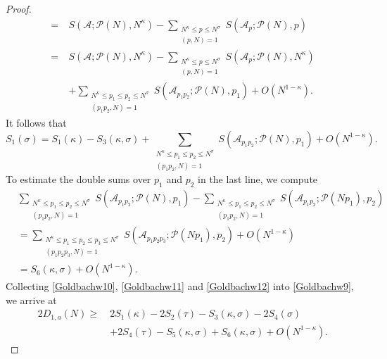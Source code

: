 \documentclass[12pt, a4paper]{amsart}
\def\le{\leqslant}
\def\ge{\geqslant}
\theoremstyle{plain}
\theoremstyle{remark}
\numberwithin{equation}{section}
\begin{document}
\begin{proof}
\begin{equation*}
\begin{split}
= \ & S(\mathscr{A};\mathscr{P}(N),N^\kappa)-\sum\limits_{\substack{N^\kappa\le p\le N^{\sigma} \\(p, N)=1}}S(\mathscr{A}_p ; \mathscr{P}(N), p)\\
= \ & S(\mathscr{A};\mathscr{P}(N),N^\kappa)-\sum\limits_{\substack{N^\kappa\le p\le N^{\sigma} \\(p, N)=1}}S(\mathscr{A}_p ; \mathscr{P}(N), N^\kappa)\\
&+\sum_{\substack{N^\kappa \le p_1 \le p_2 \le N^\sigma \\ (p_1 p_2, N) = 1}}  S(\mathscr{A}_{p_1 p_2}; \mathscr{P}(N), p_1)+O(N^{1-\kappa}). 
\end{split}
\end{equation*}
It follows that 
\begin{equation}\label{Goldbachw11}
S_1(\sigma) =
S_1(\kappa)-S_3(\kappa,\sigma)+\sum_{\substack{N^\kappa \le p_1 \le p_2 \le N^\sigma \\ (p_1 p_2, N) = 1}}  S(\mathscr{A}_{p_1 p_2}; \mathscr{P}(N), p_1)+O(N^{1-\kappa}). 
\end{equation}
To estimate the double sums over $p_1$ and $p_2$ in the last line, we compute 
\begin{equation}\label{Goldbachw12}
\begin{split}
&\sum_{\substack{N^\kappa \le p_1 \le p_2 \le N^\sigma \\ (p_1 p_2, N) = 1}}  S(\mathscr{A}_{p_1 p_2}; \mathscr{P}(N), p_1)-\sum_{\substack{N^\kappa \le p_1 \le p_2 \le N^\sigma \\ (p_1 p_2, N) = 1}}  S(\mathscr{A}_{p_1 p_2}; \mathscr{P}(Np_1), p_2)\\
&= \sum_{\substack{N^\kappa \le p_1 \le p_2 \le p_3 \le N^\sigma \\ (p_1 p_2 p_3, N) = 1}} S(\mathscr{A}_{p_1 p_2 p_3}; \mathscr{P}(N p_1), p_2)+O(N^{1-\kappa})\\
&= S_6(\kappa,\sigma)+O(N^{1-\kappa}). 
\end{split}
\end{equation}
Collecting \eqref{Goldbachw10}, \eqref{Goldbachw11} and \eqref{Goldbachw12} into \eqref{Goldbachw9}, 
we arrive at 
\begin{equation}\label{Goldbachw13}
\begin{split}
		2D_{1,a}(N)\ge\ & 2S_1(\kappa)-2S_2(\tau)-S_3(\kappa,\sigma)-2S_4(\sigma)\\
		&+2S_4(\tau)-S_5(\kappa,\sigma)+S_6(\kappa,\sigma)+O(N^{1-\kappa}). 
\end{split}
\end{equation}


\end{proof}
\end{document}
